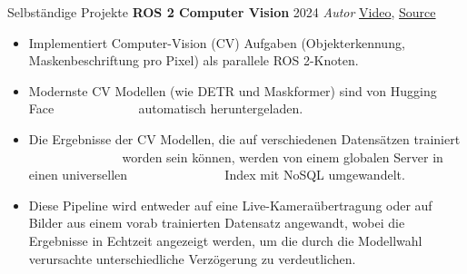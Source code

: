 \begin{rubric}{Selbständige Projekte}
\entry*[] \textbf{ROS 2 Computer Vision} \hfill 2024 \newline \emph{Autor} \hfill \href{https://github.com/NathanCorral/ROS-HF-Vision/blob/main/doc/gifs/ex_german_roads.gif}{Video}, \href{https://github.com/NathanCorral/ROS-HF-Vision/tree/main}{\faGithub Source} \newline  
\vspace{\CVItemizeHeaderSpacing} \begin{itemize}[leftmargin=*, rightmargin=1cm] 
	\setlength{\itemsep}{\CVItemizeSpacing}  
	\item Implementiert Computer-Vision (CV) Aufgaben (Objekterkennung, Maskenbeschriftung pro Pixel) als parallele ROS 2-Knoten.
	\item Modernste CV Modellen (wie DETR und Maskformer) sind von Hugging Face ~~~~~~~~~~~~ automatisch heruntergeladen.
	\item Die Ergebnisse der CV Modellen, die auf verschiedenen Datensätzen trainiert  ~~~~~~~~~~~~~~ worden sein können, werden von einem globalen Server in einen universellen ~~~~~~~~~~~~~~ Index mit NoSQL umgewandelt.  
	\item Diese Pipeline wird entweder auf eine Live-Kameraübertragung oder auf Bilder aus einem vorab trainierten Datensatz angewandt, wobei die Ergebnisse in Echtzeit angezeigt werden, um die durch die Modellwahl verursachte unterschiedliche Verzögerung zu verdeutlichen.
\end{itemize}  

\end{rubric}
